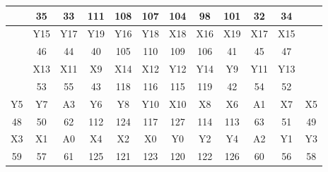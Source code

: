 \begin{longtable}{|c|c|c|c|c|c|c|c|c|c|c|c|}
        & 35  & 33  & 111 & 108 & 107 & 104 & 98  & 101 & 32  & 34  &     \\ \hline
        & Y15 & Y17 & Y19 & Y16 & Y18 & X18 & X16 & X19 & X17 & X15 &     \\ \hline
        & 46  & 44  & 40  & 105 & 110 & 109 & 106 & 41  & 45  & 47  &     \\ \hline
        & X13 & X11 & X9  & X14 & X12 & Y12 & Y14 & Y9  & Y11 & Y13 &     \\ \hline
        & 53  & 55  & 43  & 118 & 116 & 115 & 119 & 42  & 54  & 52  &     \\ \hline
    Y5  & Y7  & A3  & Y6  & Y8  & Y10 & X10 & X8  & X6  & A1  & X7  & X5  \\ \hline
    48  & 50  & 62  & 112 & 124 & 117 & 127 & 114 & 113 & 63  & 51  & 49  \\ \hline
    X3  & X1  & A0  & X4  & X2  & X0  & Y0  & Y2  & Y4  & A2  & Y1  & Y3  \\ \hline
    59  & 57  & 61  & 125 & 121 & 123 & 120 & 122 & 126 & 60  & 56  & 58  \\ \hline

\end{longtable}

